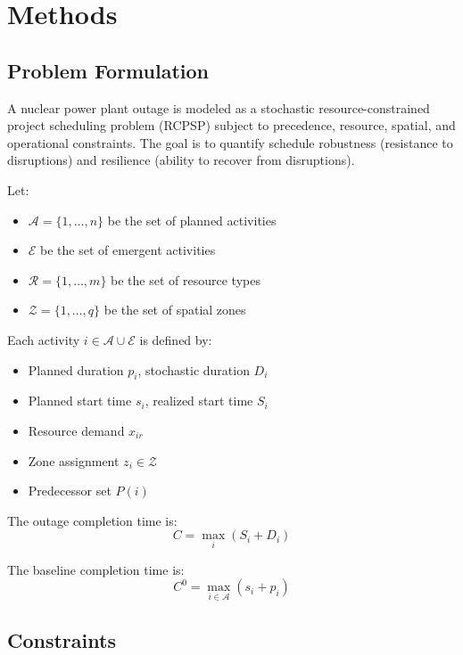\section{Methods}

\subsection{Problem Formulation}

A nuclear power plant outage is modeled as a stochastic resource-constrained project scheduling problem (RCPSP) subject to precedence, resource, spatial, and operational constraints. The goal is to quantify schedule robustness (resistance to disruptions) and resilience (ability to recover from disruptions).

Let:
\begin{itemize}
\item $\mathcal{A} = \{1,\dots,n\}$ be the set of planned activities
\item $\mathcal{E}$ be the set of emergent activities
\item $\mathcal{R} = \{1,\dots,m\}$ be the set of resource types
\item $\mathcal{Z} = \{1,\dots,q\}$ be the set of spatial zones
\end{itemize}

Each activity $i \in \mathcal{A} \cup \mathcal{E}$ is defined by:
\begin{itemize}
\item Planned duration $p_i$, stochastic duration $D_i$
\item Planned start time $s_i$, realized start time $S_i$
\item Resource demand $x_{ir}$
\item Zone assignment $z_i \in \mathcal{Z}$
\item Predecessor set $P(i)$
\end{itemize}

The outage completion time is:
\begin{equation}
C = \max_{i} (S_i + D_i)
\end{equation}

The baseline completion time is:
\begin{equation}
C^0 = \max_{i \in \mathcal{A}} (s_i + p_i)
\end{equation}

\subsection{Constraints}

